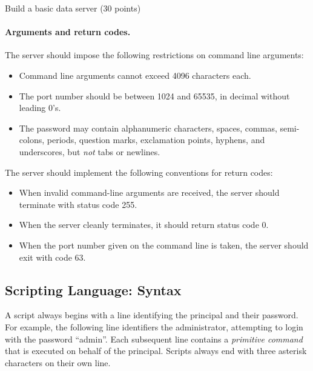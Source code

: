 \documentclass[11pt]{article}
\begin{document}
\begin{problem}{Build a basic data server (30 points)}
\paragraph{Arguments and return codes.} The server should impose the following restrictions on command line arguments:
\begin{itemize}
\item Command line arguments cannot exceed 4096 characters each.
\item The port number should be between 1024 and 65535, in decimal without leading 0's.
\item The password may contain alphanumeric characters, spaces, commas, semi-colons, periods, question marks, exclamation points, hyphens, and underscores, but \emph{not} tabs or newlines.
\end{itemize}
The server should implement the following conventions for return codes:
\begin{itemize}
\item When invalid command-line arguments are received, the server should terminate with status code 255. 
\item When the server cleanly terminates, it should return status code 0.
\item When the port number given on the command line is taken, the server should exit with code 63.
\end{itemize}

\subsection*{Scripting Language: Syntax}

A script always begins with a line identifying the principal and their password. For example, the following line identifiers the administrator, attempting to login with the password ``admin''. Each subsequent line contains a \emph{primitive command} that is executed on behalf of the principal. Scripts always end with three asterisk characters on their own line.


\end{problem}
\end{document}
